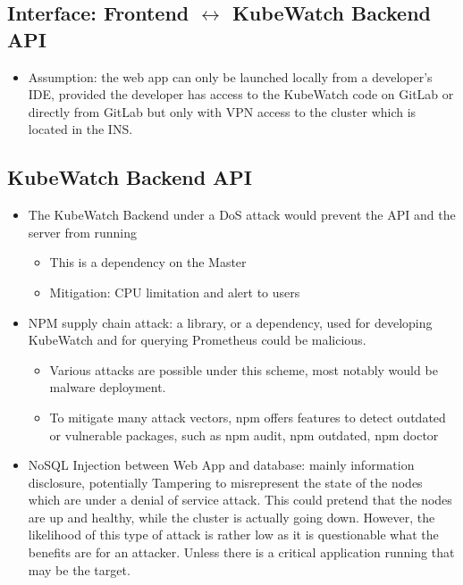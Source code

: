 \subsection{Interface: Frontend \(\leftrightarrow\) KubeWatch Backend API}
\begin{itemize}
    \item Assumption: the web app can only be launched locally from a developer's IDE, provided the developer has access to the KubeWatch code on GitLab or directly from GitLab but only with VPN access to the cluster which is located in the INS.
\end{itemize}

\subsection{KubeWatch Backend API}
\begin{itemize}
    \item The KubeWatch Backend under a DoS attack would prevent the API and the server from running
        \begin{itemize}
            \item This is a dependency on the Master
            \item Mitigation: CPU limitation and alert to users
        \end{itemize}
    \item NPM supply chain attack: a library, or a dependency, used for developing KubeWatch and for querying Prometheus could be malicious.
        \begin{itemize}
            \item Various attacks are possible under this scheme, most notably would be malware deployment.
            \item To mitigate many attack vectors, npm offers features to detect outdated or vulnerable packages, such as npm audit, npm outdated, npm doctor
        \end{itemize} 
    \item NoSQL Injection between Web App and database: mainly information disclosure, potentially Tampering to misrepresent the state of the nodes which are under a denial of service attack. This could pretend that the nodes are up and healthy, while the cluster is actually going down. However, the likelihood of this type of attack is rather low as it is questionable what the benefits are for an attacker. Unless there is a critical application running that may be the target.  
\end{itemize}

